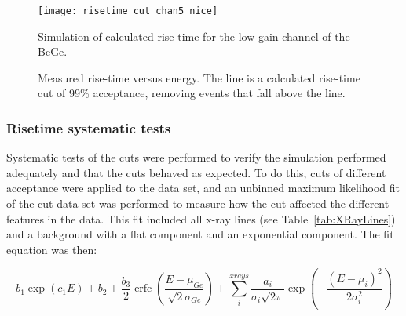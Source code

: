 				\begin{figure}
					\centering
					\texttt{[image: risetime\_cut\_chan5\_nice]}
					\caption[Simulation of calculated rise-time for the low-gain channel of the BeGe]
					{Simulation of calculated rise-time for the low-gain channel of the BeGe.}
					\label{fig:RisetimeSimulation}
				\end{figure}	
	
				\begin{figure}
					\centering
					\caption[Measured rise-time versus energy with a calculated rise-time cut of 99\% acceptance]
					{Measured rise-time versus energy.  The line is a calculated rise-time cut of 99\% acceptance, removing events that fall above the line.}
					\label{fig:RisetimeDataVsCut}
				\end{figure}	
	
		\subsubsection{Risetime systematic tests}
		\label{sec:RisetimeSystematicTests}	
	
	Systematic tests of the cuts were performed to verify the simulation performed adequately and that the cuts behaved as expected.  To do this, cuts of different acceptance were applied to the data set, and an unbinned maximum likelihood fit of the cut data set was performed to measure how the cut affected the different features in the data.  This fit included all x-ray lines (see Table~\ref{tab:XRayLines}) and a background with a flat component and an exponential component.  The fit equation was then:

					\begin{equation}
						b_{1} \exp\left(c_{1} E\right) + b_{2} + \frac{b_{3}}{2}\operatorname{erfc}\left( \frac{E - \mu_{Ge}}{\sqrt{2} \sigma_{Ge}}\right) + 
							\sum^{xrays}_{i} \frac{a_{i}}{\sigma_{i}\sqrt{2 \pi}} 
							\exp\left(-\frac{(E - \mu_{i})^{2}}{2 \sigma_{i}^{2}}\right)
						\label{eqn:InitialFitEqn}
					\end{equation}

